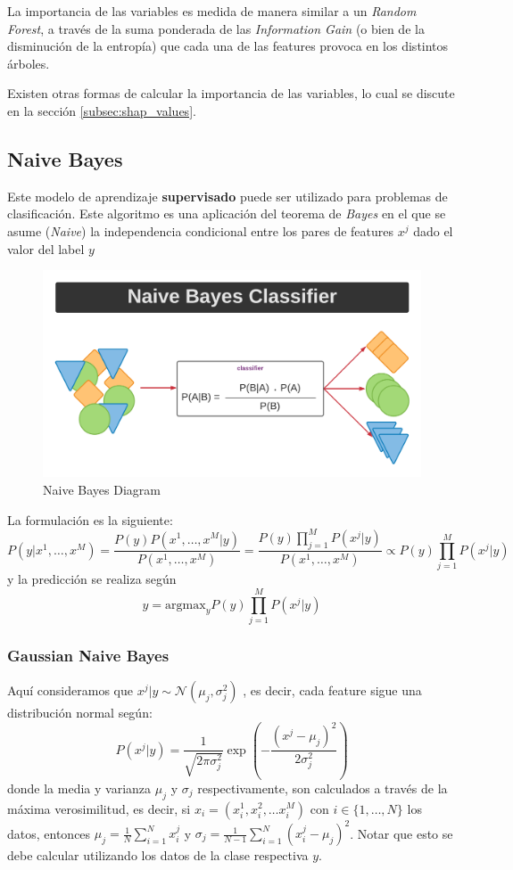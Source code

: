 La importancia de las variables es medida de manera similar a un \textit{Random Forest}, a través de la suma ponderada de las \textit{Information Gain} (o bien de la disminución de la entropía) que cada una de las features provoca en los distintos árboles. 

Existen otras formas de calcular la importancia de las variables, lo cual se discute en la sección \ref{subsec:shap_values}.

\subsection{Naive Bayes}

Este modelo de aprendizaje \textbf{supervisado} puede ser utilizado para problemas de clasificación. Este algoritmo es una aplicación del teorema de \textit{Bayes} en el que se asume (\textit{Naive}) la independencia condicional entre los pares de features $x^j$ dado el valor del label $y$

\begin{figure}[H]
    \center
    \includegraphics[scale=0.4]{notebooks/ML/img/naive_bayes_diagram.png}
    \caption{Naive Bayes Diagram}
\end{figure}

La formulación es la siguiente: 
$$
P(y | x^1 , \dots , x^M) = \frac{P(y)P(x^1 , \dots , x^M| y)}{P(x^1 , \dots , x^M)} = \frac{P(y)\prod_{j=1}^M P(x^j | y)}{P(x^1 , \dots , x^M)} \propto P(y)\prod_{j=1}^M  P(x^j | y)
$$
y la predicción se realiza según 
$$
\hat{y} = \text{argmax}_{y} P(y)\prod_{j=1}^M  P(x^j | y)
$$

\subsubsection{Gaussian Naive Bayes}

Aquí consideramos que $x^{j} | y \sim \mathcal{N}(\mu_j , \sigma_j^2)$ , es decir, cada feature sigue una distribución normal según:
$$
P(x^j | y) = \frac{1}{\sqrt{2\pi\sigma_j^2}}\exp \left(- \frac{(x^j - \mu_j)^2}{2\sigma_j^2} \right )
$$
donde la media y varianza $\mu_j$ y $\sigma_j$ respectivamente, son calculados a través de la máxima verosimilitud, es decir, si $x_{i} = (x^{1}_i, x^{2}_i, \dots x^{M}_i)$ con $i \in \{1, \dots, N\}$ los datos, entonces
$ \mu_{j} = \frac{1}{N}\sum_{i=1}^{N}x_{i}^{j}$ y $ \sigma_{j} = \frac{1}{N-1}\sum_{i=1}^{N}(x_{i}^{j}-\mu_{j})^2$. Notar que esto se debe calcular utilizando los datos de la clase respectiva $y$. 

